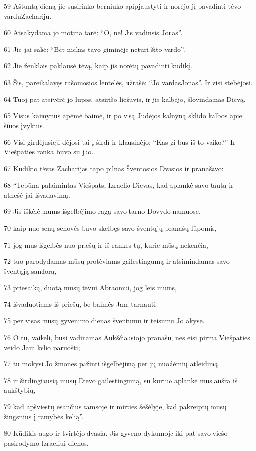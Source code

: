 \par 59 Aštuntą dieną jie susirinko berniuko apipjaustyti ir norėjo jį pavadinti tėvo vardu­Zachariju. 
\par 60 Atsakydama jo motina tarė: “O, ne! Jis vadinsis Jonas”. 
\par 61 Jie jai sakė: “Bet niekas tavo giminėje neturi šito vardo”. 
\par 62 Jie ženklais paklausė tėvą, kaip jis norėtų pavadinti kūdikį. 
\par 63 Šis, pareikalavęs rašomosios lentelės, užrašė: “Jo vardas­Jonas”. Ir visi stebėjosi. 
\par 64 Tuoj pat atsivėrė jo lūpos, atsirišo liežuvis, ir jis kalbėjo, šlovindamas Dievą. 
\par 65 Visus kaimynus apėmė baimė, ir po visą Judėjos kalnyną sklido kalbos apie šiuos įvykius. 
\par 66 Visi girdėjusieji dėjosi tai į širdį ir klausinėjo: “Kas gi bus iš to vaiko?” Ir Viešpaties ranka buvo su juo. 
\par 67 Kūdikio tėvas Zacharijas tapo pilnas Šventosios Dvasios ir pranašavo: 
\par 68 “Tebūna palaimintas Viešpats, Izraelio Dievas, kad aplankė savo tautą ir atnešė jai išvadavimą. 
\par 69 Jis iškėlė mums išgelbėjimo ragą savo tarno Dovydo namuose, 
\par 70 kaip nuo senų senovės buvo skelbęs savo šventųjų pranašų lūpomis, 
\par 71 jog mus išgelbės nuo priešų ir iš rankos tų, kurie mūsų nekenčia, 
\par 72 tuo parodydamas mūsų protėviams gailestingumą ir atsimindamas savo šventąją sandorą, 
\par 73 priesaiką, duotą mūsų tėvui Abraomui, jog leis mums, 
\par 74 išvaduotiems iš priešų, be baimės Jam tarnauti 
\par 75 per visas mūsų gyvenimo dienas šventumu ir teisumu Jo akyse.­ 
\par 76 O tu, vaikeli, būsi vadinamas Aukščiausiojo pranašu, nes eisi pirma Viešpaties veido Jam kelio paruošti; 
\par 77 tu mokysi Jo žmones pažinti išgelbėjimą per jų nuodėmių atleidimą 
\par 78 ir širdingiausią mūsų Dievo gailestingumą, su kuriuo aplankė mus aušra iš aukštybių, 
\par 79 kad apšviestų esančius tamsoje ir mirties šešėlyje, kad pakreiptų mūsų žingsnius į ramybės kelią”. 
\par 80 Kūdikis augo ir tvirtėjo dvasia. Jis gyveno dykumoje iki pat savo viešo pasirodymo Izraeliui dienos.


